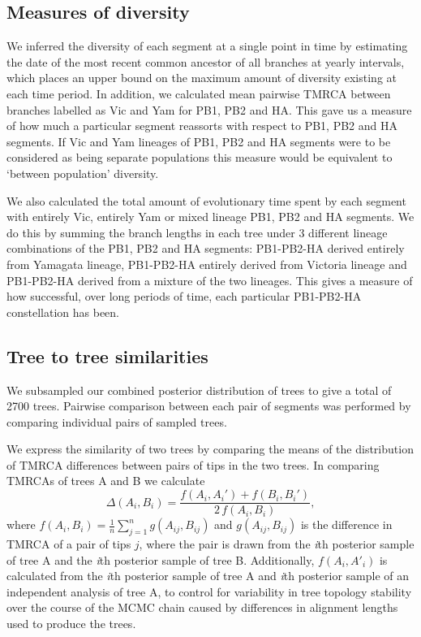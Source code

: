\documentclass[11pt,oneside,letterpaper]{article}
\begin{document}
\subsection*{Measures of diversity}
We inferred the diversity of each segment at a single point in time by estimating the date of the most recent common ancestor of all branches at yearly intervals, which places an upper bound on the maximum amount of diversity existing at each time period.
In addition, we calculated mean pairwise TMRCA between branches labelled as Vic and Yam for PB1, PB2 and HA.
This gave us a measure of how much a particular segment reassorts with respect to PB1, PB2 and HA segments.
If Vic and Yam lineages of PB1, PB2 and HA segments were to be considered as being separate populations this measure would be equivalent to `between population' diversity.

We also calculated the total amount of evolutionary time spent by each segment with entirely Vic, entirely Yam or mixed lineage PB1, PB2 and HA segments.
We do this by summing the branch lengths in each tree under 3 different lineage combinations of the PB1, PB2 and HA segments: PB1-PB2-HA derived entirely from Yamagata lineage, PB1-PB2-HA entirely derived from Victoria lineage and PB1-PB2-HA derived from a mixture of the two lineages.
This gives a measure of how successful, over long periods of time, each particular PB1-PB2-HA constellation has been.

\subsection*{Tree to tree similarities}
We subsampled our combined posterior distribution of trees to give a total of 2700 trees.
Pairwise comparison between each pair of segments was performed by comparing individual pairs of sampled trees.

We express the similarity of two trees by comparing the means of the distribution of TMRCA differences between pairs of tips in the two trees.
In comparing TMRCAs of trees A and B we calculate
\begin{equation}
\Delta(A_i, B_i) = \frac{f(A_i, A_i') + f(B_i, B_i')}{2 \, f(A_i, B_i)},
\end{equation}
where $f(A_i, B_i) = \frac{1}{n}\sum_{j=1}^n g(A_{ij}, B_{ij})$ and $g(A_{ij},B_{ij})$ is the difference in TMRCA of a pair of tips $j$, where the pair is drawn from the \textit{i}th posterior sample of tree A and the \textit{i}th posterior sample of tree B.
Additionally, $f(A_i,A'_i)$ is calculated from the \textit{i}th posterior sample of tree A and \textit{i}th posterior sample of an independent analysis of tree A, to control for variability in tree topology stability over the course of the MCMC chain caused by differences in alignment lengths used to produce the trees.
\end{document}
